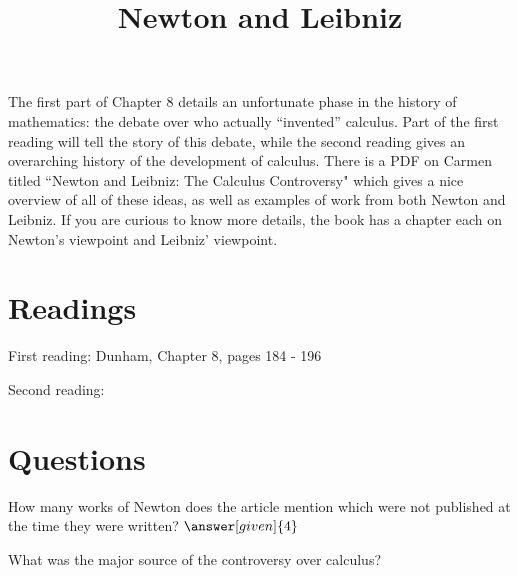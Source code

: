 \documentclass[nooutcomes]{ximera}
\title{Newton and Leibniz}
\begin{document}
\begin{abstract}
    
\end{abstract}
\maketitle

The first part of Chapter 8 details an unfortunate phase in the history of mathematics: the debate over who actually ``invented'' calculus.  Part of the first reading will tell the story of this debate, while the second reading gives an overarching history of the development of calculus.  There is a PDF on Carmen titled ``Newton and Leibniz: The Calculus Controversy" which gives a nice overview of all of these ideas, as well as examples of work from both Newton and Leibniz. If you are curious to know more details, the book  has a chapter each on Newton's viewpoint and Leibniz' viewpoint.




\section{Readings}
First reading: Dunham, Chapter 8, pages 184 - 196

Second reading: 


\section{Questions}

\begin{question}
How many works of Newton does the article mention which were not published at the time they were written?
$\answer[given]{4}$
\end{question}

\begin{question}
What was the major source of the controversy over calculus?
\begin{multipleChoice}
\end{multipleChoice}
\end{question}


%
\end{document}
